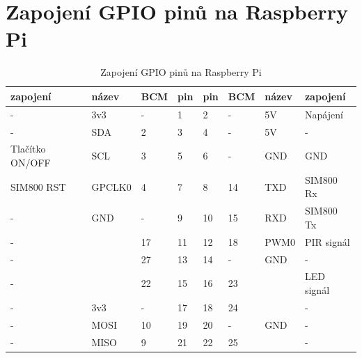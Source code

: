 \chapter{Zapojení GPIO pinů na Raspberry Pi}
\begin{table}[h]
\centering
\caption{Zapojení GPIO pinů na Raspberry Pi}
\label{gpio}
\begin{tabular}{|l|l|l|l|l|l|l|l|}
\hline
\textbf{zapojení} & \textbf{název} & \textbf{BCM} & \textbf{pin} & \textbf{pin} & \textbf{BCM} & \textbf{název} & \textbf{zapojení} \\ \hline
-                 & 3v3            & -            & 1            & 2            & -            & 5V             & Napájení                \\ \hline
-                 & SDA            & 2            & 3            & 4            & -            & 5V             & -                 \\ \hline
 Tlačítko ON/OFF  & SCL            & 3            & 5            & 6            & -            & GND            & GND                 \\ \hline
 SIM800 RST       & GPCLK0         & 4            & 7            & 8            & 14           & TXD            & SIM800 Rx         \\ \hline
-                 & GND            & -            & 9            & 10           & 15           & RXD            & SIM800 Tx         \\ \hline
-                 &                & 17           & 11           & 12           & 18           & PWM0           & PIR signál        \\ \hline
-                 &                & 27           & 13           & 14           & -            & GND            & -                 \\ \hline
-                 &                & 22           & 15           & 16           & 23           &                & LED signál        \\ \hline
-                 & 3v3            & -            & 17           & 18           & 24           &                & -                 \\ \hline
-                 & MOSI           & 10           & 19           & 20           & -            & GND            & -                 \\ \hline
-                 & MISO           & 9            & 21           & 22           & 25           &                & -                 \\ \hline

\end{tabular}
\end{table}
